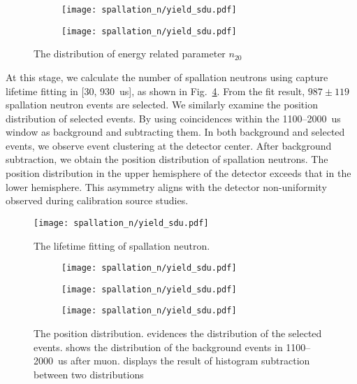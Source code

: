 \begin{figure}[htbp]
	\centering
	\begin{subfigure}{0.5\textwidth}
		\centering
		\texttt{[image: spallation\_n/yield\_sdu.pdf]}
		\caption{}
		\label{fig:coinESPN0}
	\end{subfigure}%
	\begin{subfigure}{0.5\textwidth}
		\centering
		\texttt{[image: spallation\_n/yield\_sdu.pdf]}
		\caption{}
		\label{fig:coinESPN1}
	\end{subfigure}
	\caption{The distribution of energy related parameter $n_{20}$}
	\label{fig:coinESPN}
\end{figure}

At this stage, we calculate the number of spallation neutrons using capture lifetime fitting in [30, \SI{930}{us}], as shown in Fig.~\ref{fig:lifeSPNSDU}. From the fit result, $987\pm 119$ spallation neutron events are selected. We similarly examine the position distribution of selected events. By using coincidences within the 1100--\SI{2000}{us} window as background and subtracting them. In both background and selected events, we observe event clustering at the detector center. After background subtraction, we obtain the position distribution of spallation neutrons. The position distribution in the upper hemisphere of the detector exceeds that in the lower hemisphere. This asymmetry aligns with the detector non-uniformity observed during calibration source studies.
\begin{figure}[htbp]
	\centering
	\texttt{[image: spallation\_n/yield\_sdu.pdf]}
	\caption{The lifetime fitting of spallation neutron.}
	\label{fig:lifeSPNSDU}
\end{figure}

\begin{figure}[htbp]
	\centering
	\begin{subfigure}{0.5\textwidth}
		\centering
		\texttt{[image: spallation\_n/yield\_sdu.pdf]}
		\caption{}
		\label{fig:coinPOS_sig}
	\end{subfigure}%
	\begin{subfigure}{0.5\textwidth}
		\centering
		\texttt{[image: spallation\_n/yield\_sdu.pdf]}
		\caption{}
		\label{fig:coinPOS_bkg}
	\end{subfigure}
	\begin{subfigure}{0.5\textwidth}
		\centering
		\texttt{[image: spallation\_n/yield\_sdu.pdf]}
		\caption{}
		\label{fig:coinPOS_ex}
	\end{subfigure}
	\caption{The position distribution.  evidences the distribution of the selected events.  shows the distribution of the background events in 1100--\SI{2000}{us} after muon.  displays the result of histogram subtraction between two distributions}
	\label{fig:coinPOS}
\end{figure}

